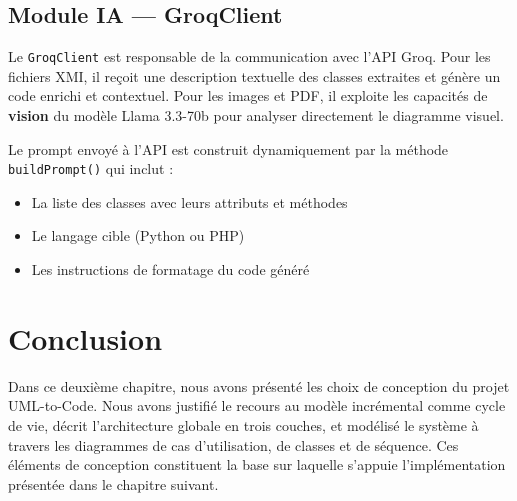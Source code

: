 \subsection{Module IA — GroqClient}

Le \texttt{GroqClient} est responsable de la communication avec l'API Groq. Pour les fichiers XMI, il reçoit une description textuelle des classes extraites et génère un code enrichi et contextuel. Pour les images et PDF, il exploite les capacités de \textbf{vision} du modèle Llama 3.3-70b pour analyser directement le diagramme visuel.

Le prompt envoyé à l'API est construit dynamiquement par la méthode \texttt{buildPrompt()} qui inclut :
\begin{itemize}
    \item La liste des classes avec leurs attributs et méthodes
    \item Le langage cible (Python ou PHP)
    \item Les instructions de formatage du code généré
\end{itemize}

\section*{Conclusion}

Dans ce deuxième chapitre, nous avons présenté les choix de conception du projet UML-to-Code. Nous avons justifié le recours au modèle incrémental comme cycle de vie, décrit l'architecture globale en trois couches, et modélisé le système à travers les diagrammes de cas d'utilisation, de classes et de séquence. Ces éléments de conception constituent la base sur laquelle s'appuie l'implémentation présentée dans le chapitre suivant.